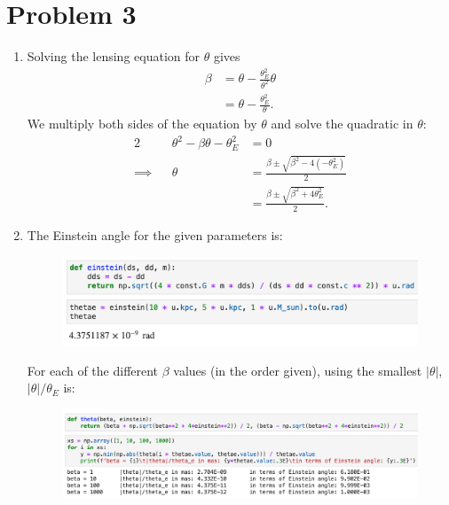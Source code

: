 \documentclass[11pt,letterpaper]{article}
\begin{document}
\newpage
\section*{Problem 3}

\begin{enumerate}[label=(\roman*)]
    \item Solving the lensing equation for $\theta$ gives 
        \begin{align*}
            \beta &= \theta - \frac{\theta_E^2}{\theta^2}\theta \\
            &= \theta - \frac{\theta_E^2}{\theta}.
        \end{align*}
        We multiply both sides of the equation by $\theta$ and solve the quadratic in $\theta$:
        \begin{alignat*}{2}
            &&\theta^2 - \beta\theta - \theta_E^2 &= 0 \\
            \implies&& \theta &= \frac{\beta \pm \sqrt{\beta^2 - 4(-\theta_E^2)}}{2} \\
            &&& = \frac{\beta \pm \sqrt{\beta^2 + 4\theta_E^2}}{2}.
        \end{alignat*}

    \item The Einstein angle for the given parameters is:
        \begin{figure}[!ht]
            \centering
            \includegraphics[width=0.7\linewidth]{figures/einstein_angle.png}
        \end{figure}

        For each of the different $\beta$ values (in the order given), using the smallest $|\theta|$, $|\theta|/\theta_E$ is:
        \begin{figure}[!ht]
            \centering
            \includegraphics[width=0.9\linewidth]{figures/theta_thetae.png}
        \end{figure}


\end{enumerate}
\end{document}
